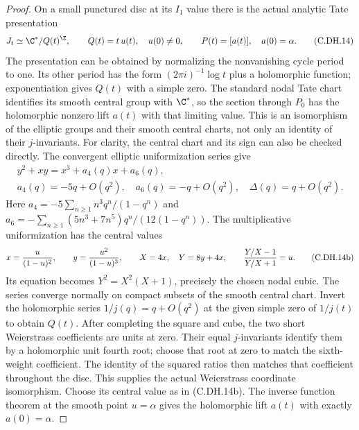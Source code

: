 \begin{proof}
On a small punctured
disc at its $I_1$ value
there is the actual
analytic Tate presentation
\[
 J_t\simeq\C^*/Q(t)^{\Z},\qquad
 Q(t)=t\,u(t),\quad u(0)\ne0,
 \qquad P(t)=[a(t)],\quad a(0)=\alpha.
                                                               \tag{C.DH.14}
\]
The presentation can be
obtained by normalizing
the nonvanishing cycle
period to one. Its
other period has the
form $(2\pi i)^{-1}\log t$
plus a holomorphic
function; exponentiation
gives $Q(t)$ with a
simple zero. The
standard nodal Tate
chart identifies its
smooth central group
with $\C^*$, so the
section through $P_0$
has the holomorphic
nonzero lift $a(t)$
with that limiting
value. This is an
isomorphism of the
elliptic groups and
their smooth central
charts, not only an
identity of their
$j$-invariants.
For clarity, the central
chart and its sign can
also be checked directly.
The convergent elliptic
uniformization series give
\[
 \begin{gathered}
 y^2+xy=x^3+a_4(q)x+a_6(q),\\
 a_4(q)=-5q+O(q^2),\quad
 a_6(q)=-q+O(q^2),\quad
 \Delta(q)=q+O(q^2).
 \end{gathered}                                 \tag{C.DH.14a}
\]
Here $a_4=-5\sum_{n\ge1}n^3q^n/(1-q^n)$ and
$a_6=-\sum_{n\ge1}(5n^3+7n^5)q^n/(12(1-q^n))$.
The multiplicative
uniformization has the
central values
\[
 x={u\over(1-u)^2},\qquad
 y={u^2\over(1-u)^3},\qquad
 X=4x,\quad Y=8y+4x,\qquad
 {Y/X-1\over Y/X+1}=u.                          \tag{C.DH.14b}
\]
Its equation becomes
$Y^2=X^2(X+1)$, precisely
the chosen nodal cubic.
The series converge
normally on compact
subsets of the smooth
central chart. Invert
the holomorphic series
$1/j(q)=q+O(q^2)$ at
the given simple zero
of $1/j(t)$ to obtain
$Q(t)$. After completing
the square and cube,
the two short Weierstrass
coefficients are units
at zero. Their equal
$j$-invariants identify
them by a holomorphic
unit fourth root; choose
that root at zero to
match the sixth-weight
coefficient. The identity
of the squared ratios
then matches that
coefficient throughout
the disc. This supplies
the actual Weierstrass
coordinate isomorphism.
Choose its central value
as in (C.DH.14b).
The inverse function
theorem at the smooth
point $u=\alpha$ gives
the holomorphic lift
$a(t)$ with exactly
$a(0)=\alpha$.


\end{proof}
